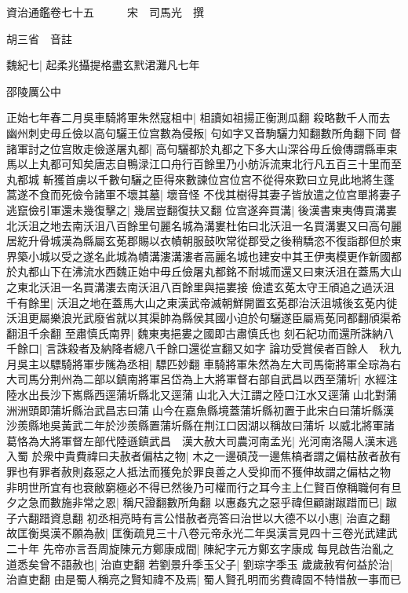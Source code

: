 資治通鑑卷七十五　　　宋　司馬光　撰

胡三省　音註

魏紀七|{
	起柔兆攝提格盡玄黓涒灘凡七年}


邵陵厲公中

正始七年春二月吳車騎將軍朱然寇柤中|{
	柤讀如祖揚正衡測瓜翻}
殺略數千人而去　幽州刺史毋丘儉以高句驪王位宫數為侵叛|{
	句如字又音駒驪力知翻數所角翻下同}
督諸軍討之位宫敗走儉遂屠丸都|{
	高句驪都於丸都之下多大山深谷毋丘儉傳謂縣車束馬以上丸都可知矣唐志自鴨渌江口舟行百餘里乃小舫泝流東北行凡五百三十里而至丸都城}
斬獲首虜以千數句驪之臣得來數諫位宫位宫不從得來歎曰立見此地將生蓬蒿遂不食而死儉令諸軍不壞其墓|{
	壞音怪}
不伐其樹得其妻子皆放遣之位宫單將妻子逃竄儉引軍還未幾復擊之|{
	幾居豈翻復扶又翻}
位宫遂奔買溝|{
	後漢書東夷傳買溝婁北沃沮之地去南沃沮八百餘里句麗名城為溝婁杜佑曰北沃沮一名買溝婁又曰高句麗居紇升骨城漢為縣屬玄莬郡賜以衣幘朝服鼓吹常從郡受之後稍驕恣不復詣郡但於東界築小城以受之遂名此城為幘溝漊溝漊者高麗名城也建安中其王伊夷模更作新國都於丸都山下在沸流水西魏正始中毋丘儉屠丸都銘不耐城而還又曰東沃沮在蓋馬大山之東北沃沮一名買溝漊去南沃沮八百餘里與挹婁接}
儉遣玄莬太守王頎追之過沃沮千有餘里|{
	沃沮之地在蓋馬大山之東漢武帝滅朝鮮開置玄莬郡治沃沮城後玄莬内徙沃沮更屬樂浪光武廢省就以其渠帥為縣侯其國小迫於句驪遂臣屬焉莬同都翻頎渠希翻沮千余翻}
至肅慎氏南界|{
	魏東夷挹婁之國即古肅慎氏也}
刻石紀功而還所誅納八千餘口|{
	言誅殺者及納降者總八千餘口還從宣翻又如字}
論功受賞侯者百餘人　秋九月吳主以驃騎將軍步隲為丞相|{
	驃匹妙翻}
車騎將軍朱然為左大司馬衛將軍全琮為右大司馬分荆州為二部以鎮南將軍呂岱為上大將軍督右部自武昌以西至蒲圻|{
	水經注陸水出長沙下嶲縣西逕蒲圻縣北又逕蒲山北入大江謂之陸口江水又逕蒲山北對蒲洲洲頭即蒲圻縣治武昌志曰蒲山今在嘉魚縣境蓋蒲圻縣初置于此宋白曰蒲圻縣漢沙羨縣地吳黃武二年於沙羨縣置蒲圻縣在荆江口因湖以稱故曰蒲圻}
以威北將軍諸葛恪為大將軍督左部代陸遜鎮武昌　漢大赦大司農河南孟光|{
	光河南洛陽人漢末逃入蜀}
於衆中貴費禕曰夫赦者偏枯之物|{
	木之一邊碩茂一邊焦槁者謂之偏枯赦者赦有罪也有罪者赦則姦惡之人抵法而獲免於罪良善之人受抑而不獲伸故謂之偏枯之物}
非明世所宜有也衰敝窮極必不得已然後乃可權而行之耳今主上仁賢百僚稱職何有旦夕之急而數施非常之恩|{
	稱尺證翻數所角翻}
以惠姦宄之惡乎禕但顧謝踧踖而已|{
	踧子六翻踖資息翻}
初丞相亮時有言公惜赦者亮答曰治世以大德不以小惠|{
	治直之翻}
故匡衡吳漢不願為赦|{
	匡衡疏見三十八卷元帝永光二年吳漢言見四十三卷光武建武二十年}
先帝亦言吾周旋陳元方鄭康成間|{
	陳紀字元方鄭玄字康成}
每見啟告治亂之道悉矣曾不語赦也|{
	治直吏翻}
若劉景升季玉父子|{
	劉琮字季玉}
歲歲赦宥何益於治|{
	治直吏翻}
由是蜀人稱亮之賢知禕不及焉|{
	蜀人賢孔明而劣費禕固不特惜赦一事而已}


